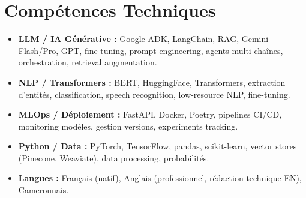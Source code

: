 \documentclass[a4paper,11pt]{article}
\begin{document}
\section{Comp\'etences Techniques}
\begin{itemize}[leftmargin=*, nosep]
    \item \small{\textbf{LLM / IA G\'enérative :} Google ADK, LangChain, RAG, Gemini Flash/Pro, GPT, fine-tuning, prompt engineering, agents multi-chaînes, orchestration, retrieval augmentation.}
    \item \small{\textbf{NLP / Transformers :} BERT, HuggingFace, Transformers, extraction d'entités, classification, speech recognition, low-resource NLP, fine-tuning.}
    \item \small{\textbf{MLOps / D\'eploiement :} FastAPI, Docker, Poetry, pipelines CI/CD, monitoring modèles, gestion versions, experiments tracking.}
    \item \small{\textbf{Python / Data :} PyTorch, TensorFlow, pandas, scikit-learn, vector stores (Pinecone, Weaviate), data processing, probabilités.}
    \item \small{\textbf{Langues :} Français (natif), Anglais (professionnel, rédaction technique EN), Camerounais.}
\end{itemize}
\end{document}
